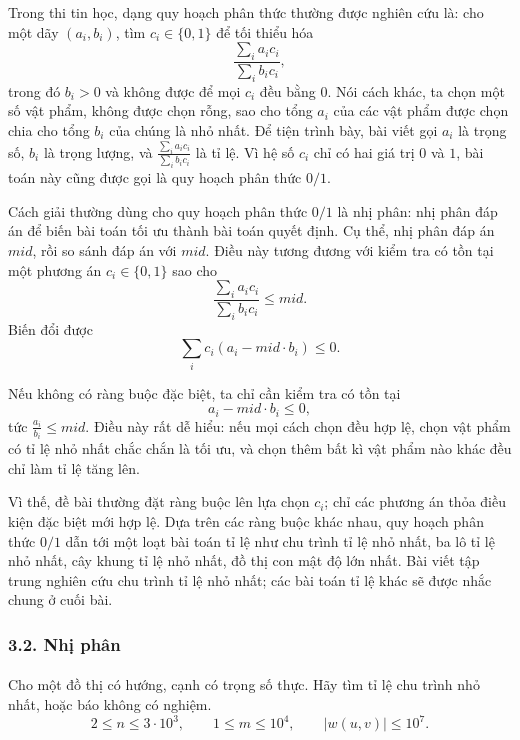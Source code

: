 \documentclass[11pt]{article}
\begin{document}
Trong thi tin học, dạng quy hoạch phân thức thường được nghiên cứu là: cho một
dãy \((a_i,b_i)\), tìm \(c_i\in\{0,1\}\) để tối thiểu hóa
\[
  \frac{\sum_i a_ic_i}{\sum_i b_ic_i},
\]
trong đó \(b_i>0\) và không được để mọi \(c_i\) đều bằng \(0\). Nói cách khác,
ta chọn một số vật phẩm, không được chọn rỗng, sao cho tổng \(a_i\) của các vật
phẩm được chọn chia cho tổng \(b_i\) của chúng là nhỏ nhất. Để tiện trình bày,
bài viết gọi \(a_i\) là trọng số, \(b_i\) là trọng lượng, và
\(\frac{\sum_i a_ic_i}{\sum_i b_ic_i}\) là tỉ lệ. Vì hệ số \(c_i\) chỉ có hai
giá trị \(0\) và \(1\), bài toán này cũng được gọi là quy hoạch phân thức
\(0/1\).

Cách giải thường dùng cho quy hoạch phân thức \(0/1\) là nhị phân: nhị phân
đáp án để biến bài toán tối ưu thành bài toán quyết định. Cụ thể, nhị phân đáp
án \(\mathit{mid}\), rồi so sánh đáp án với \(\mathit{mid}\). Điều này tương
đương với kiểm tra có tồn tại một phương án \(c_i\in\{0,1\}\) sao cho
\[
  \frac{\sum_i a_ic_i}{\sum_i b_ic_i}\le \mathit{mid}.
\]
Biến đổi được
\[
  \sum_i c_i(a_i-\mathit{mid}\cdot b_i)\le0.
\]

Nếu không có ràng buộc đặc biệt, ta chỉ cần kiểm tra có tồn tại
\[
  a_i-\mathit{mid}\cdot b_i\le0,
\]
tức \(\frac{a_i}{b_i}\le\mathit{mid}\). Điều này rất dễ hiểu: nếu mọi cách
chọn đều hợp lệ, chọn vật phẩm có tỉ lệ nhỏ nhất chắc chắn là tối ưu, và chọn
thêm bất kì vật phẩm nào khác đều chỉ làm tỉ lệ tăng lên.

Vì thế, đề bài thường đặt ràng buộc lên lựa chọn \(c_i\); chỉ các phương án
thỏa điều kiện đặc biệt mới hợp lệ. Dựa trên các ràng buộc khác nhau, quy
hoạch phân thức \(0/1\) dẫn tới một loạt bài toán tỉ lệ như chu trình tỉ lệ nhỏ
nhất, ba lô tỉ lệ nhỏ nhất, cây khung tỉ lệ nhỏ nhất, đồ thị con mật độ lớn
nhất. Bài viết tập trung nghiên cứu chu trình tỉ lệ nhỏ nhất; các bài toán tỉ
lệ khác sẽ được nhắc chung ở cuối bài.

\subsubsection*{3.2. Nhị phân}

\paragraph{}
Cho một đồ thị có hướng, cạnh có trọng số thực. Hãy tìm tỉ lệ chu trình nhỏ
nhất, hoặc báo không có nghiệm.
\[
  2\le n\le3\cdot10^3,\qquad
  1\le m\le10^4,\qquad
  |w(u,v)|\le10^7.
\]
\end{document}
